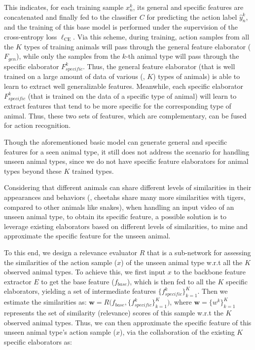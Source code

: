 \documentclass[10pt,twocolumn,letterpaper]{article}
\begin{document}
    This indicates, for each training sample $x_n^k$, its general and specific features are concatenated and finally fed to the classifier $C$ for predicting the action label $\hat{y}_n^k$, and the training of this base model is performed under the supervision of the cross-entropy loss $\ell_\textrm{CE}$. Via this scheme, during training, action samples from all the $K$ types of training animals will pass through the general feature elaborator ($F_{gen}$), while only the samples from the $k$-th animal type will pass through the specific elaborator $F^k_{specific}$. Thus, the general feature elaborator (that is well trained on a large amount of data of various (\ie, $K$) types of animals) is able to learn to extract well generalizable features. Meanwhile, each specific elaborator $F^k_{specific}$ (that is trained on the data of a specific type of animal) will learn to extract features that tend to be more specific for the corresponding type of animal. Thus, these two sets of features, which are complementary, can be fused for action recognition.
    
    
    Though the aforementioned basic model can generate general and specific features for a seen animal type, it still does not address the scenario for handling unseen animal types, since we do not have specific feature elaborators for animal types beyond these $K$ trained types. 
    
    
    Considering that different animals can share different levels of similarities in their appearances and behaviors (\eg, cheetahs share many more similarities with tigers, compared to other animals like snakes), when handling an input video of an unseen animal type, to obtain its specific feature, a possible solution is to leverage existing elaborators based on different levels of similarities, to mine and approximate the specific feature for the unseen animal.
    
    To this end, we design a relevance evaluator $R$ that is a sub-network for assessing the similarities of the action sample ($x$) of the unseen animal type w.r.t all the $K$ observed animal types.
    To achieve this, we first input $x$ to the backbone feature extractor $E$ to get the base feature ($f_{base}$), which is then fed to all the $K$ specific elaborators, yielding a set of intermediate features $\{f^k_{specific}\}_{k=1}^K$.
    Then we estimate the similarities as: $\textbf{w}=R\big(f_{base}, \{f^k_{specific}\}_{k=1}^K \big)$, where $\textbf{w} = \{w^k\}_{k=1}^K$ represents the set of similarity (relevance) scores of this sample w.r.t the $K$ observed animal types.
    Thus, we can then approximate the specific feature of this unseen animal type's action sample ($x$), via the collaboration of the existing $K$ specific elaborators as:
    
\end{document}
